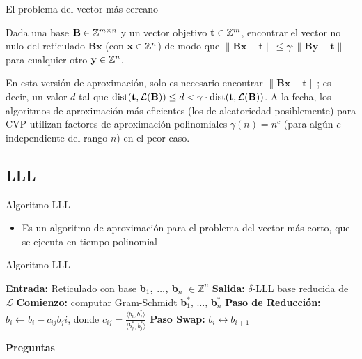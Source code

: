 \begin{frame}{El problema del vector más cercano}
\begin{definition}
Dada una base $\mathbf{B}\in \mathbb{Z}^{m\times n}$ y un vector objetivo $\mathbf{t} \in \mathbb{Z}^m$, encontrar el vector no nulo del reticulado $\mathbf{Bx}$ (con $\mathbf{x}\in \mathbb{Z}^n$) de modo que $\|\mathbf{Bx}-\mathbf{t}\| \leq \gamma \cdot \|\mathbf{By}-\mathbf{t}\|$ para cualquier otro $\mathbf{y} \in \mathbb{Z}^n$.
\end{definition}

En esta versión de aproximación, solo es necesario encontrar $\|\mathbf{Bx}-\mathbf{t}\|$; es decir, un valor $d$ tal que $\text{dist}(\mathbf{t},\mathcal{L}(\mathbf{B})) \leq d < \gamma \cdot \text{dist}(\mathbf{t},\mathcal{L}(\mathbf{B}))$.
A la fecha, los algoritmos de aproximación más eficientes (los de aleatoriedad posiblemente) para CVP utilizan factores de aproximación polinomiales $\gamma(n) = n^c$ (para algún $c$ independiente del rango $n$) en el peor caso.

\end{frame}

\subsection{LLL}
\begin{frame}{Algoritmo LLL}
    \begin{itemize}
        \item Es un algoritmo de aproximación para el problema del vector más corto, que se ejecuta en tiempo polinomial
    \end{itemize}
\end{frame}

\begin{frame}{Algoritmo LLL}
    \begin{algorithmic}
    \State \textbf{Entrada:} Reticulado con base \textbf{b$_1$, $\dots$, b$_n$} $\in \mathbb{Z}^n$
    \State \textbf{Salida:} $\delta$-LLL base reducida de $\mathcal{L}$
    \State \textbf{Comienzo:} computar Gram-Schmidt \textbf{b}$_1^*$, $\dots$, \textbf{b}$_n^*$
    \State \textbf{Paso de Reducción:}
            \State $b_i \gets b_i - c_{ij}b_ji$, donde $c_{ij} = \frac{\langle b_i, b^*_j \rangle}{\langle b^*_j,b^*_j \rangle}$ 
        \EndFor
    \EndFor
    \State \textbf{Paso Swap:} 
        \State $b_i\leftrightarrow b_{i+1}$
    \EndIf
    \end{algorithmic}
\end{frame}

\begin{frame}
    \begin{center}
        {\huge \bf Preguntas}
    \end{center}
\end{frame}

